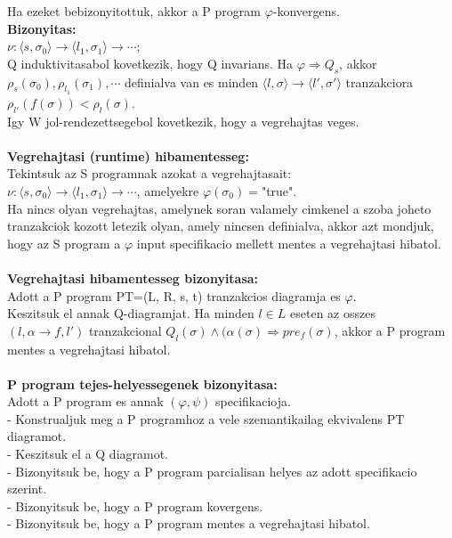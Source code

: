 \documentclass[a4paper,10pt]{article}
\begin{document}
Ha ezeket bebizonyitottuk, akkor a P program $\varphi$-konvergens.\\
\textbf{Bizonyitas:} \\
$\nu: \langle s, \sigma_0\rangle \to \langle l_1, \sigma_1\rangle \to \cdots$;\\
Q induktivitasabol kovetkezik, hogy Q invarians. Ha $\varphi \Rightarrow Q_s$, akkor\\
$\rho_s(\sigma_0), \rho_{l_1}(\sigma_1), \cdots$ definialva van es minden $\langle l, \sigma\rangle \to \langle l', \sigma'\rangle$ tranzakciora $\rho_{l'}(f(\sigma))<\rho_l(\sigma)$.\\
Igy W jol-rendezettsegebol kovetkezik, hogy a vegrehajtas veges.\\\\
\textbf{Vegrehajtasi (runtime) hibamentesseg:}\\
Tekintsuk az S programnak azokat a vegrehajtasait:\\
$\nu: \langle s, \sigma_0\rangle \to \langle l_1, \sigma_1\rangle \to \cdots$, amelyekre $\varphi(\sigma_0)=$"true".\\
Ha nincs olyan vegrehajtas, amelynek soran valamely cimkenel a szoba joheto tranzakciok kozott letezik olyan, amely nincsen definialva, akkor azt mondjuk, hogy az S program a $\varphi$ input specifikacio mellett mentes a vegrehajtasi hibatol.\\\\
\textbf{Vegrehajtasi hibamentesseg bizonyitasa:}\\
Adott a P program PT=(L, R, s, t) tranzakcios diagramja es $\varphi$.\\
Keszitsuk el annak Q-diagramjat. Ha minden $l\in L$ eseten az osszes $(l, \alpha\to f, l')$ tranzakcional $Q_l(\sigma)\wedge(\alpha(\sigma) \Rightarrow pre_f(\sigma)$, akkor a P program mentes a vegrehajtasi hibatol.\\\\
\textbf{P program tejes-helyessegenek bizonyitasa:}\\
Adott a P program es annak $(\varphi, \psi)$ specifikacioja.\\
- Konstrualjuk meg a P programhoz a vele szemantikailag ekvivalens PT diagramot.\\
- Keszitsuk el a Q diagramot.\\
- Bizonyitsuk be, hogy a P program parcialisan helyes az adott specifikacio szerint.\\
- Bizonyitsuk be, hogy a P program kovergens.\\
- Bizonyitsuk be, hogy a P program mentes a vegrehajtasi hibatol.\\
\end{document}
